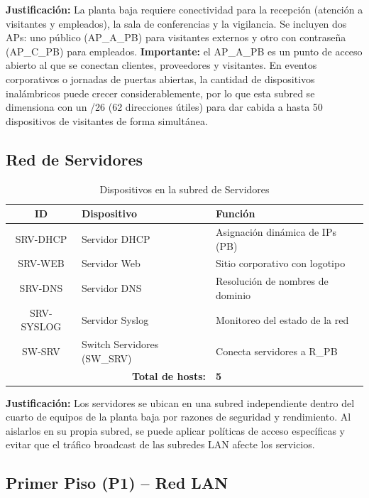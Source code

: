 \documentclass[letterpaper,11pt]{article}
\begin{document}
\textbf{Justificación:} La planta baja requiere conectividad para la recepción (atención a visitantes y empleados), la sala de conferencias y la vigilancia. Se incluyen dos APs: uno público (AP\_A\_PB) para visitantes externos y otro con contraseña (AP\_C\_PB) para empleados. \textbf{Importante:} el AP\_A\_PB es un punto de acceso abierto al que se conectan clientes, proveedores y visitantes. En eventos corporativos o jornadas de puertas abiertas, la cantidad de dispositivos inalámbricos puede crecer considerablemente, por lo que esta subred se dimensiona con un /26 (62 direcciones útiles) para dar cabida a hasta 50 dispositivos de visitantes de forma simultánea.

\subsection{Red de Servidores}

\begin{table}[H]
\centering
\caption{Dispositivos en la subred de Servidores}
\begin{tabular}{|c|l|l|}
\hline
\textbf{ID} & \textbf{Dispositivo} & \textbf{Función} \\
\hline
SRV-DHCP & Servidor DHCP & Asignación dinámica de IPs (PB) \\
SRV-WEB & Servidor Web & Sitio corporativo con logotipo \\
SRV-DNS & Servidor DNS & Resolución de nombres de dominio \\
SRV-SYSLOG & Servidor Syslog & Monitoreo del estado de la red \\
SW-SRV & Switch Servidores (SW\_SRV) & Conecta servidores a R\_PB \\
\hline
\multicolumn{2}{|r|}{\textbf{Total de hosts:}} & \textbf{5} \\
\hline
\end{tabular}
\end{table}

\textbf{Justificación:} Los servidores se ubican en una subred independiente dentro del cuarto de equipos de la planta baja por razones de seguridad y rendimiento. Al aislarlos en su propia subred, se puede aplicar políticas de acceso específicas y evitar que el tráfico broadcast de las subredes LAN afecte los servicios.

\subsection{Primer Piso (P1) -- Red LAN}
\end{document}
